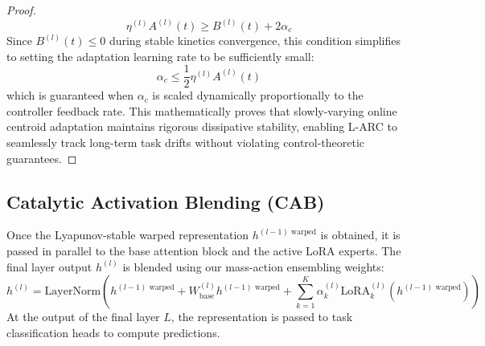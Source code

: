 \begin{proof}
\begin{equation*}
\eta^{(l)} A^{(l)}(t) \ge B^{(l)}(t) + 2 \alpha_c
\end{equation*}
Since $B^{(l)}(t) \le 0$ during stable kinetics convergence, this condition simplifies to setting the adaptation learning rate to be sufficiently small:
\begin{equation}
\alpha_c \le \frac{1}{2} \eta^{(l)} A^{(l)}(t)
\label{eq:adaptation_rate_bound}
\end{equation}
which is guaranteed when $\alpha_c$ is scaled dynamically proportionally to the controller feedback rate. This mathematically proves that slowly-varying online centroid adaptation maintains rigorous dissipative stability, enabling L-ARC to seamlessly track long-term task drifts without violating control-theoretic guarantees.
\end{proof}

\subsection{Catalytic Activation Blending (CAB)}
Once the Lyapunov-stable warped representation $h^{(l-1) \text{ warped}}$ is obtained, it is passed in parallel to the base attention block and the active LoRA experts. The final layer output $h^{(l)}$ is blended using our mass-action ensembling weights:
\begin{equation}
h^{(l)} = \text{LayerNorm}\left( h^{(l-1) \text{ warped}} + W_{\text{base}}^{(l)} h^{(l-1) \text{ warped}} + \sum_{k=1}^K \alpha_k^{(l)} \text{LoRA}_k^{(l)}\left(h^{(l-1) \text{ warped}}\right) \right)
\label{eq:cab}
\end{equation}
At the output of the final layer $L$, the representation is passed to task classification heads to compute predictions.
